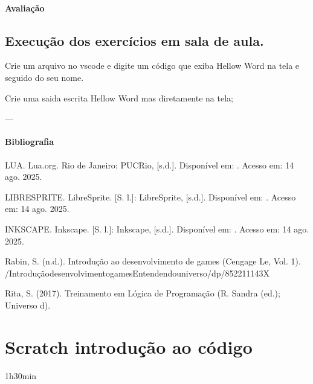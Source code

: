 \documentclass[letterpaper,10pt,brazil]{sphinxmanual}
\begin{document}
\subsubsection*{Avaliação}


\section{Execução dos exercícios em sala de aula.}
\label{\detokenize{modelo_aula_02:execucao-dos-exercicios-em-sala-de-aula}}
\sphinxAtStartPar
{}
Crie um arquivo no vscode e digite um código que exiba Hellow Word na tela e seguido do seu nome.

\sphinxAtStartPar
{}
Crie uma saida escrita Hellow Word mas diretamente na tela;

\sphinxAtStartPar
—
\subsubsection*{Bibliografia}

\sphinxAtStartPar
LUA. Lua.org. Rio de Janeiro: PUC\sphinxhyphen{}Rio, {[}s.d.{]}.
Disponível em: . Acesso em: 14 ago. 2025.

\sphinxAtStartPar
LIBRESPRITE. LibreSprite. {[}S. l.{]}: LibreSprite, {[}s.d.{]}.
Disponível em: . Acesso em: 14 ago. 2025.

\sphinxAtStartPar
INKSCAPE. Inkscape. {[}S. l.{]}: Inkscape, {[}s.d.{]}.
Disponível em: . Acesso em: 14 ago. 2025.

\sphinxAtStartPar
Rabin, S. (n.d.). Introdução ao desenvolvimento de games (Cengage Le, Vol. 1).
/Introdução\sphinxhyphen{}desenvolvimento\sphinxhyphen{}games\sphinxhyphen{}Entendendo\sphinxhyphen{}universo/dp/852211143X

\sphinxAtStartPar
Rita, S. (2017). Treinamento em Lógica de Programação (R. Sandra (ed.); Universo d).

\sphinxstepscope


\chapter{Scratch \sphinxhyphen{} introdução ao código}
\label{\detokenize{modelo_aula_03:scratch-introducao-ao-codigo}}\label{\detokenize{modelo_aula_03::doc}}
\sphinxAtStartPar
{} 1h30min
\end{document}
